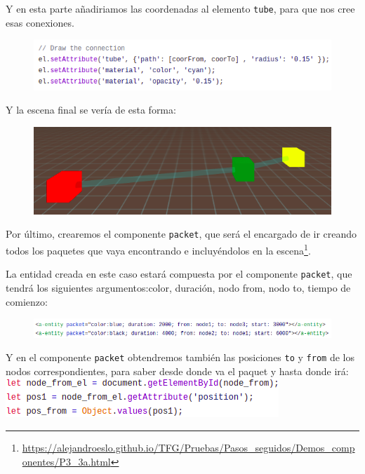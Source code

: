 \documentclass[a4paper, 12pt]{book}
\begin{document}
Y en esta parte añadiriamos las coordenadas al elemento \texttt{tube}, para que nos cree esas conexiones.
\begin{figure}[h]
\centering
    \includegraphics[scale=0.7]{img/puesta_datos.png}
\end{figure}

Y la escena final se vería de esta forma:

\begin{figure}[h]
\centering
    \includegraphics[scale=0.7]{img/componenteCONNECTION.png}
\end{figure}

Por último, crearemos el componente \texttt{packet}, que será el encargado de ir creando todos los paquetes que vaya encontrando e incluyéndolos en la escena\footnote{\url{https://alejandroeslo.github.io/TFG/Pruebas/Pasos_seguidos/Demos_componentes/P3_3a.html}}.

La entidad creada en este caso estará compuesta por el componente \texttt{packet}, que tendrá los siguientes argumentos:color, duración, nodo from, nodo to, tiempo de comienzo:


\begin{figure}[h]
\centering
    \includegraphics[scale=0.7]{img/entidad_packet.png}
\end{figure}

Y en el componente \texttt{packet} obtendremos también las posiciones \texttt{to} y \texttt{from} de los nodos correspondientes, para saber desde donde va el paquet y hasta donde irá:\\

    \includegraphics[scale=0.7]{img/pos_packet1.png}
\end{document}
